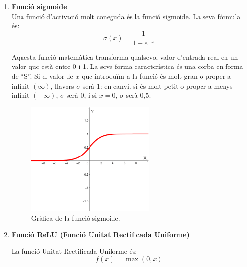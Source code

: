 \begin{enumerate}
    \item \label{sigmoide}{\textbf{Funció sigmoide}}\\
    Una funció d'activació molt coneguda és la funció sigmoide. La seva fórmula és:
    $$ \sigma(x) = \frac{1}{1 + e^{-x}} $$

    Aquesta funció matemàtica transforma qualsevol valor d'entrada real en un valor que està entre 0 i 1. La seva forma característica és una corba en forma de ``S''. Si el valor de $x$ que introduïm a la funció és molt gran o proper a infinit $(\infty)$, llavors $\sigma$ serà 1; en canvi, si és molt petit o proper a menys infinit $(-\infty)$, $\sigma$ serà 0, i si $x = 0$, $\sigma$ serà 0,5.

    \begin{figure}[h!]
        \centering
        \includegraphics[width=0.6\textwidth]{./figures/grafica_sigmoide.png}
        \caption{Gràfica de la funció sigmoide.}
    \end{figure}
\clearpage
    \item \hypertarget{subsec:1}{\textbf{Funció ReLU (Funció Unitat Rectificada Uniforme)}}

    La funció Unitat Rectificada Uniforme és:
    $$f(x) = \max(0, x)$$


\end{enumerate}
